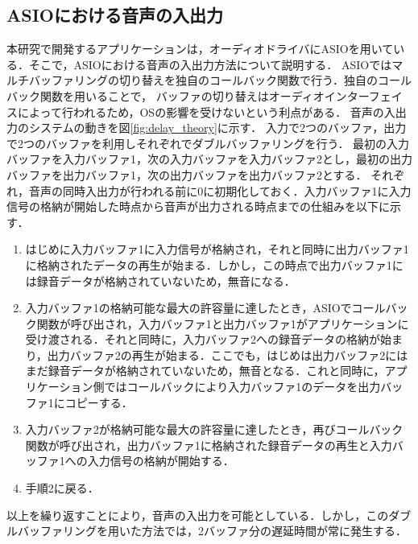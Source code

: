 \subsection{ASIOにおける音声の入出力}
本研究で開発するアプリケーションは，オーディオドライバにASIOを用いている．そこで，ASIOにおける音声の入出力方法について説明する．
ASIOではマルチバッファリングの切り替えを独自のコールバック関数で行う．独自のコールバック関数を用いることで，
バッファの切り替えはオーディオインターフェイスによって行われるため，OSの影響を受けないという利点がある．
音声の入出力のシステムの動きを図\ref{fig:delay_theory}に示す．
入力で2つのバッファ，出力で2つのバッファを利用しそれぞれでダブルバッファリングを行う．
最初の入力バッファを入力バッファ1，次の入力バッファを入力バッファ2とし，最初の出力バッファを出力バッファ1，次の出力バッファを出力バッファ2とする．
それぞれ，音声の同時入出力が行われる前に0に初期化しておく．入力バッファ1に入力信号の格納が開始した時点から音声が出力される時点までの仕組みを以下に示す．
\begin{enumerate}[leftmargin=*]
\item はじめに入力バッファ1に入力信号が格納され，それと同時に出力バッファ1に格納されたデータの再生が始まる．しかし，この時点で出力バッファ1には録音データが格納されていないため，無音になる．
\item 入力バッファ1の格納可能な最大の許容量に達したとき，ASIOでコールバック関数が呼び出され，入力バッファ1と出力バッファ1がアプリケーションに受け渡される．それと同時に，入力バッファ2への録音データの格納が始まり，出力バッファ2の再生が始まる．ここでも，はじめは出力バッファ2にはまだ録音データが格納されていないため，無音となる．これと同時に，アプリケーション側ではコールバックにより入力バッファ1のデータを出力バッファ1にコピーする．
\item 入力バッファ2が格納可能な最大の許容量に達したとき，再びコールバック関数が呼び出され，出力バッファ1に格納された録音データの再生と入力バッファ1への入力信号の格納が開始する．
\item 手順2に戻る．
\end{enumerate}
以上を繰り返すことにより，音声の入出力を可能としている．しかし，このダブルバッファリングを用いた方法では，2バッファ分の遅延時間が常に発生する．
